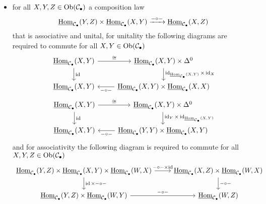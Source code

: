 \begin{defi}
\begin{itemize}
		\item 
		for all $ X , Y , Z \in \operatorname{Ob} ( \mathcal{ C }_\bullet ) $ a composition law
		\[
			\underline{ \operatorname{Hom} }_{ \mathcal{ C }_\bullet } ( Y , Z ) 
			\times 
			\underline{ \operatorname{Hom} }_{ \mathcal{ C }_\bullet } ( X , Y )
			\xrightarrow{- \circ - }
		   	\underline{ \operatorname{Hom} }_{ \mathcal{ C }_\bullet } ( X , Z )
		\] 
		that is associative and unital, for unitality the following diagrams are required to commute for all $ X , Y \in \operatorname{Ob} ( \mathcal{ C_\bullet } ) $
		\[
		\begin{tikzcd}
			 \underline{ \Hom }_{ \mathcal{ C }_\bullet } ( X , Y )
			 \ar[r, " \cong "]
			 \ar[d, "\id"]
			 &
			 \underline{ \Hom }_{ \mathcal{ C }_\bullet } ( X , Y ) \times \Delta^0
			 \ar[d, " \id_{  \underline{ \Hom }_{ \mathcal{ C }_\bullet } ( X ,Y ) } \times \id_X "]
			 \\
			 \underline{ \Hom }_{ \mathcal{ C }_\bullet } ( X , Y )
			 &
			 \underline{ \Hom }_{ \mathcal{ C }_\bullet } ( X , Y ) \times  \underline{ \Hom }_{ \mathcal{ C }_\bullet } ( X , X )
			 \ar[l, "- \circ -"] 
		\end{tikzcd}
		\]
		\[
		\begin{tikzcd}
			\underline{ \Hom }_{ \mathcal{ C }_\bullet } ( X , Y )
			\ar[r, " \cong "]
			\ar[d, "\id"]
			&
			\underline{ \Hom }_{ \mathcal{ C }_\bullet } ( X , Y ) \times \Delta^0
			\ar[d, " \id_Y \times \id_{  \underline{ \Hom }_{ \mathcal{ C }_\bullet } ( X ,Y ) } "]
			\\
			\underline{ \Hom }_{ \mathcal{ C }_\bullet } ( X , Y )
			&
			\underline{ \Hom }_{ \mathcal{ C }_\bullet } ( Y , Y ) \times \underline{ \Hom }_{ \mathcal{ C }_\bullet } ( X , Y )
			\ar[l, "- \circ -"] 
		\end{tikzcd}
		\]
		and for associativity the following diagram is required to commute for all $ X , Y , Z \in \operatorname{Ob} ( \mathcal{ C }_\bullet ) $
		\[
		\begin{tikzcd}
			\underline{ \Hom }_{ \mathcal{ C }_\bullet }  ( Y , Z ) 
			\times
			\underline{ \Hom }_{ \mathcal{ C }_\bullet }  ( X , Y ) 
			\times 
			\underline{ \Hom }_{ \mathcal{ C }_\bullet } ( W , X )
			\ar[r, " - \circ - \times \id"]
			\ar[d, " \id \times - \circ -"]
			&
			\underline{ \Hom }_{ \mathcal{ C }_\bullet } ( X , Z )
			\times
			\underline{ \Hom }_{ \mathcal{ C }_\bullet } ( W ,X ) 
			\ar[d, "- \circ - "]
			\\
			\underline{ \Hom }_{ \mathcal{ C }_\bullet } ( Y , Z )
			\times 
			\underline{ \Hom }_{ \mathcal{ C }_\bullet } ( W ,Y ) 
			\ar[r, " - \circ - "]
			&
			\underline{ \Hom }_{ \mathcal{ C }_\bullet } ( W , Z ) 
		\end{tikzcd}
		\]
	\end{itemize}
\end{defi}

